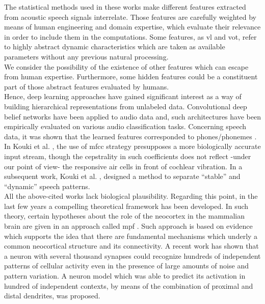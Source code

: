 \documentclass[11pt,a4paper]{article}
\begin{document}
The statistical methods used in these works make
different features extracted from acoustic speech signals
interrelate.
Those features are carefully weighted
by means of human engineering and domain expertise,
which evaluate their relevance in order to include them
in the computations.
Some features, as \gls{vl} and \gls{vot},
refer to highly abstract dynamic characteristics
which are taken
as available parameters without any previous natural
processing.\\

We consider the possibility of the existence of other
features which can escape from human expertise.
Furthermore, some hidden features could be a constituent
part of those abstract features evaluated by humans. \\

Hence, deep learning approaches have gained significant interest as a
way of building hierarchical representations from unlabeled data.
Convolutional deep belief networks have been applied to audio data and,
such architectures have been empirically evaluated on various audio classification
tasks. Concerning speech data, it was shown that the learned features corresponded
to phones/phonemes \cite{Lee:2009:UFL:2984093.2984217}. \\

In Kouki et al. \cite{kouki_2010},
the use of \gls{mfcc}
strategy presupposes a more biologically accurate input stream,
though the cepstrality in such coefficients does not reflect
-under our point of view-
the responsive air cells in front of cochlear vibration.
In a subsequent work, Kouki et al. \cite{kouki_2011},
designed a method to separate “stable” and “dynamic” speech
patterns. \\

All the above-cited works lack biological plausibility.
Regarding this point, in the last few years a compelling
theoretical framework has been developed.
In such theory, certain hypotheses about the role of
the neocortex in the mammalian brain are given in an
approach called \gls{mpf}
\cite{hawkins_2004}.
Such approach is based on evidence
which supports the idea that there are fundamental
mechanisms which underly a common neocortical
structure and its connectivity.
A recent work has shown that a neuron with
several thousand synapses could recognize hundreds
of independent patterns of cellular activity even
in the presence of large amounts of
noise and pattern variation.
A neuron model which was able to predict its activation in hundred 
of independent contexts, by means of
the combination of proximal and distal dendrites, was proposed.
\end{document}

